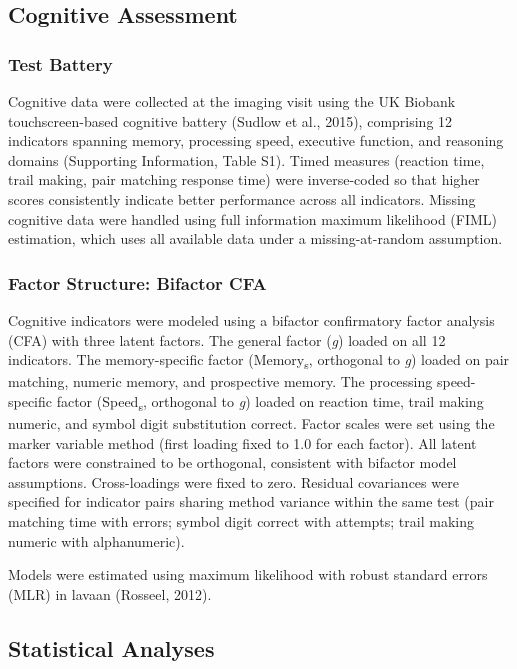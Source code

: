\documentclass[
]{article}
\begin{document}
\subsection{Cognitive Assessment}\label{cognitive-assessment}

\subsubsection{Test Battery}\label{test-battery}

Cognitive data were collected at the imaging visit using the UK Biobank
touchscreen-based cognitive battery (Sudlow et al., 2015), comprising 12
indicators spanning memory, processing speed, executive function, and
reasoning domains (Supporting Information, Table S1). Timed measures
(reaction time, trail making, pair matching response time) were
inverse-coded so that higher scores consistently indicate better
performance across all indicators. Missing cognitive data were handled
using full information maximum likelihood (FIML) estimation, which uses
all available data under a missing-at-random assumption.

\subsubsection{Factor Structure: Bifactor
CFA}\label{factor-structure-bifactor-cfa}

Cognitive indicators were modeled using a bifactor confirmatory factor
analysis (CFA) with three latent factors. The general factor (\emph{g})
loaded on all 12 indicators. The memory-specific factor
(Memory\textsubscript{s}, orthogonal to \emph{g}) loaded on pair
matching, numeric memory, and prospective memory. The processing
speed-specific factor (Speed\textsubscript{s}, orthogonal to \emph{g})
loaded on reaction time, trail making numeric, and symbol digit
substitution correct. Factor scales were set using the marker variable
method (first loading fixed to 1.0 for each factor). All latent factors
were constrained to be orthogonal, consistent with bifactor model
assumptions. Cross-loadings were fixed to zero. Residual covariances
were specified for indicator pairs sharing method variance within the
same test (pair matching time with errors; symbol digit correct with
attempts; trail making numeric with alphanumeric).

Models were estimated using maximum likelihood with robust standard
errors (MLR) in lavaan (Rosseel, 2012).

\subsection{Statistical Analyses}\label{statistical-analyses}
\end{document}
